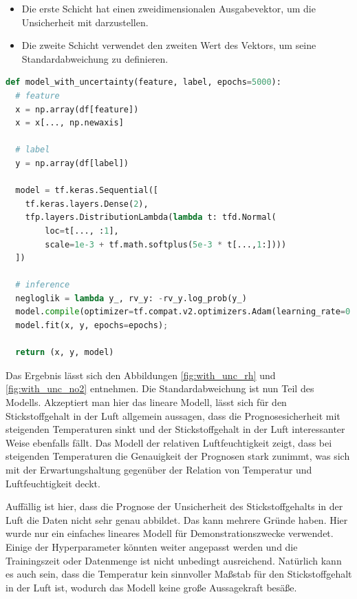 \documentclass[12pt]{article}
\begin{document}
\begin{itemize}
  \item Die erste Schicht hat einen zweidimensionalen Ausgabevektor, um die Unsicherheit mit darzustellen.
  \item Die zweite Schicht verwendet den zweiten Wert des Vektors, um seine Standardabweichung zu definieren. 
\end{itemize}

\begin{lstlisting}[language=Python, caption={Modell mit Keras mit Unsicherheit}, label={lst:model_with_uncertainty}]
def model_with_uncertainty(feature, label, epochs=5000):
  # feature
  x = np.array(df[feature])
  x = x[..., np.newaxis]

  # label
  y = np.array(df[label])
  
  model = tf.keras.Sequential([
    tf.keras.layers.Dense(2),
    tfp.layers.DistributionLambda(lambda t: tfd.Normal(
        loc=t[..., :1],
        scale=1e-3 + tf.math.softplus(5e-3 * t[...,1:])))
  ])

  # inference
  negloglik = lambda y_, rv_y: -rv_y.log_prob(y_)
  model.compile(optimizer=tf.compat.v2.optimizers.Adam(learning_rate=0.01), loss=negloglik)
  model.fit(x, y, epochs=epochs);

  return (x, y, model)
\end{lstlisting}

Das Ergebnis lässt sich den Abbildungen \ref{fig:with_unc_rh} und \ref{fig:with_unc_no2} entnehmen. Die Standardabweichung ist nun Teil des Modells. Akzeptiert man hier das lineare Modell, lässt sich für den Stickstoffgehalt in der Luft allgemein aussagen, dass die Prognosesicherheit mit steigenden Temperaturen sinkt und der Stickstoffgehalt in der Luft interessanter Weise ebenfalls fällt. Das Modell der relativen Luftfeuchtigkeit zeigt, dass bei steigenden Temperaturen die Genauigkeit der Prognosen stark zunimmt, was sich mit der Erwartungshaltung gegenüber der Relation von Temperatur und Luftfeuchtigkeit deckt.

Auffällig ist hier, dass die Prognose der Unsicherheit des Stickstoffgehalts in der Luft die Daten nicht sehr genau abbildet. Das kann mehrere Gründe haben. Hier wurde nur ein einfaches lineares Modell für Demonstrationszwecke verwendet. Einige der Hyperparameter könnten weiter angepasst werden und die Trainingszeit oder Datenmenge ist nicht unbedingt ausreichend. Natürlich kann es auch sein, dass die Temperatur kein sinnvoller Maßstab für den Stickstoffgehalt in der Luft ist, wodurch das Modell keine große Aussagekraft besäße. 
\end{document}
